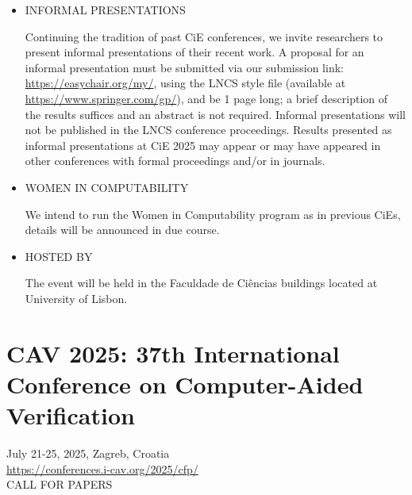 \documentclass[prodmode,acmtecs]{acmsmall} %
\begin{document}
\begin{itemize}
\item  INFORMAL PRESENTATIONS 
 
  Continuing the tradition of past CiE conferences, we invite researchers to present informal presentations of their recent work. A proposal for an informal presentation must be submitted via our submission link: \href{https://easychair.org/my/}{https://easychair.org/my/}, using the LNCS style file (available at \href{https://www.springer.com/gp/}{https://www.springer.com/gp/}), and be 1 page long; a brief description of the results suffices and an abstract is not required. Informal presentations will not be published in the LNCS conference proceedings. Results presented as informal presentations at CiE 2025 may appear or may have appeared in other conferences with formal proceedings and/or in journals. 
 
\item  WOMEN IN COMPUTABILITY 
 
  We intend to run the Women in Computability program as in previous CiEs, details will be announced in due course. 
 
\item  HOSTED BY 
 
  The event will be held in the Faculdade de Ciências buildings located at University of Lisbon. 
 
\end{itemize}\section{CAV 2025: 37th International Conference on Computer-Aided Verification}\label{CAV2025}  July 21-25, 2025, Zagreb, Croatia\\ 
  \href{https://conferences.i-cav.org/2025/cfp/}{https://conferences.i-cav.org/2025/cfp/}\\ 
CALL FOR PAPERS 
\end{document}
